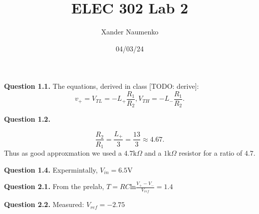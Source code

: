 \documentclass[letterpaper, reqno,11pt]{article}
\begin{document}
\title{ELEC 302 Lab 2}
\date{04/03/24}
\author{Xander Naumenko}
\maketitle

{\medskip\noindent\bf Question 1.1.} The equations, derived in class [TODO: derive]:
\[
v_{+}= V_{TL}=-L_+ \frac{R_1}{R_2}, V_{TH}= -L_- \frac{R_1}{R_2}
.\]

{\medskip\noindent\bf Question 1.2.} 

\[
\frac{R_2}{R_1}=\frac{L_+}{3}=\frac{13}{3}\approx 4.67
.\]
Thus as  good approxmation we used a $4.7\text{k}\Omega$ and a $1\text{k}\Omega$ resistor for a ratio of $4.7$.

{\medskip\noindent\bf Question 1.4.} Expermintally, $V_{in}=6.5$V

{\medskip\noindent\bf Question 2.1.} From the prelab, $T=RC\text{ln} \frac{V_+-V_-}{V_{ref}}=1.4$

{\medskip\noindent\bf Question 2.2.} Measured: $V_{ref}=-2.75$
\end{document}
